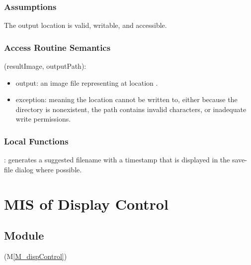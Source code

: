 \documentclass[12pt, titlepage]{article}
\newcommand{\mref}[1]{M\ref{#1}}
\newcommand{\mrefp}[1]{(\mref{#1})}
\begin{document}
\subsubsection{Assumptions}
The output location is valid, writable, and accessible.

\subsubsection{Access Routine Semantics}

\noindent {}(resultImage, outputPath):
\begin{itemize}
\item output: an image file representing  at location . 
\item exception:  meaning the location cannot be written to, either because
  the directory is nonexistent, the path contains invalid characters, or inadequate write permissions.
\end{itemize}

\subsubsection{Local Functions}
: generates a suggested filename with a timestamp
that is displayed in the save-file dialog where possible.

\newpage



\section{MIS of Display Control} \label{MS_dispControl}

\subsection{Module}
 \mrefp{M_dispControl}
\end{document}

